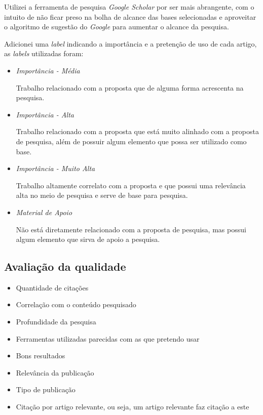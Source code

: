 \documentclass[conference]{IEEEtran}
\begin{document}
Utilizei a ferramenta de pesquisa \emph{Google Scholar} por ser mais abrangente, com o intuito de não ficar preso na bolha de alcance das bases selecionadas e aproveitar o algoritmo de sugestão do \emph{Google} para aumentar o alcance da pesquisa.

Adicionei uma \emph{label} indicando a importância e a pretenção de uso de cada artigo, as \emph{labels} utilizadas foram:
\begin{itemize}
    \item \emph{Importância - Média}
    
        Trabalho relacionado com a proposta que de alguma forma acrescenta na pesquisa.
        
    \item \emph{Importância - Alta}
        
        Trabalho relacionado com a proposta que está muito alinhado com a proposta de pesquisa, além de possuir algum elemento que possa ser utilizado como base.
    
    \item \emph{Importância - Muito Alta}
    
        Trabalho altamente correlato com a proposta e que possui uma relevância alta no meio de pesquisa e serve de base para pesquisa.
    
    \item \emph{Material de Apoio}
    
        Não está diretamente relacionado com a proposta de pesquisa, mas possui algum elemento que sirva de apoio a pesquisa.
\end{itemize}

\subsection{Avaliação da qualidade}
\begin{itemize}
    \item Quantidade de citações
    \item Correlação com o conteúdo pesquisado
    \item Profundidade da pesquisa
    \item Ferramentas utilizadas parecidas com as que pretendo usar
    \item Bons resultados
    \item Relevância da publicação
    \item Tipo de publicação
    \item Citação por artigo relevante, ou seja, um artigo relevante faz citação a este
\end{itemize}
\end{document}
